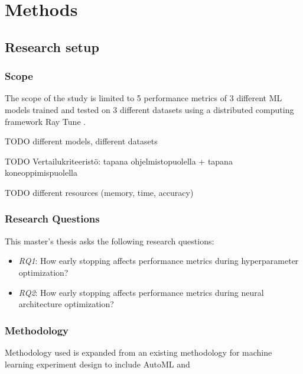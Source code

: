 \chapter{Methods}

\section{Research setup}
\subsection{Scope}
The scope of the study is limited to 5 performance metrics of 3 different ML models trained and tested on 3 different datasets using a distributed computing framework Ray Tune \parencite{liawTuneResearchPlatform2018}.

TODO different models, different datasets

TODO Vertailukriteeristö: tapana ohjelmistopuolella + tapana koneoppimispuolella

TODO different resources (memory, time, accuracy)



\subsection{Research Questions}
This master's thesis asks the following research questions:
\begin{itemize}
    \item \emph{RQ1}: How early stopping affects performance metrics during hyperparameter optimization?
    \item \emph{RQ2}: How early stopping affects performance metrics during neural architecture optimization?
\end{itemize}

\subsection{Methodology}

Methodology used is expanded from an existing methodology for machine learning experiment design \parencite{fernandez-lozanoMethodologyDesignExperiments2016} to include AutoML and 

